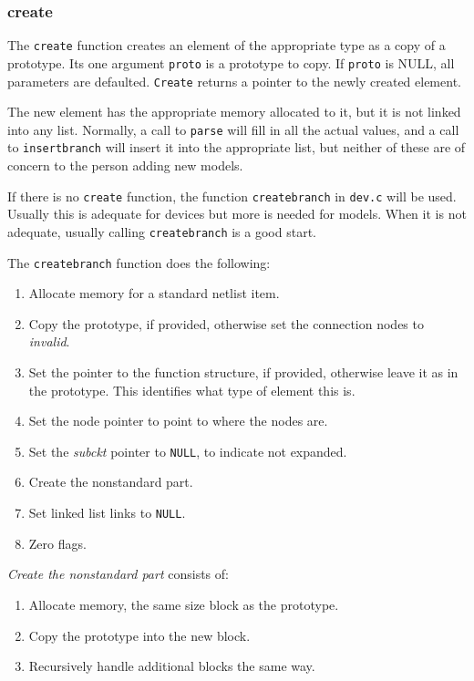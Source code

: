 \subsubsection{create}

The {\tt create} function creates an element of the appropriate type as a
copy of a prototype.  Its one argument {\tt proto} is a prototype to copy.
If {\tt proto} is NULL, all parameters are defaulted.  {\tt Create} returns
a pointer to the newly created element.

The new element has the appropriate memory allocated to it, but it is not
linked into any list.  Normally, a call to {\tt parse} will fill in all the
actual values, and a call to {\tt insertbranch} will insert it into the
appropriate list, but neither of these are of concern to the person adding
new models.

If there is no {\tt create} function, the function {\tt createbranch} in {\tt dev.c} will be used.  Usually this is adequate for devices but more is needed for models.  When it is not adequate, usually calling {\tt createbranch} is a good start.

The {\tt createbranch} function does the following:
\begin{enumerate}
\item Allocate memory for a standard netlist item.
\item Copy the prototype, if provided, otherwise set the connection nodes to
{\em invalid}.
\item Set the pointer to the function structure, if provided, otherwise
leave it as in the prototype.  This identifies what type of element this is.
\item Set the node pointer to point to where the nodes are.
\item Set the {\em subckt} pointer to {\tt NULL}, to indicate not expanded.
\item Create the nonstandard part.
\item Set linked list links to {\tt NULL}.
\item Zero flags.
\end{enumerate}

{\em Create the nonstandard part} consists of:
\begin{enumerate}
\item Allocate memory, the same size block as the prototype.
\item Copy the prototype into the new block.
\item Recursively handle additional blocks the same way.
\end{enumerate}


